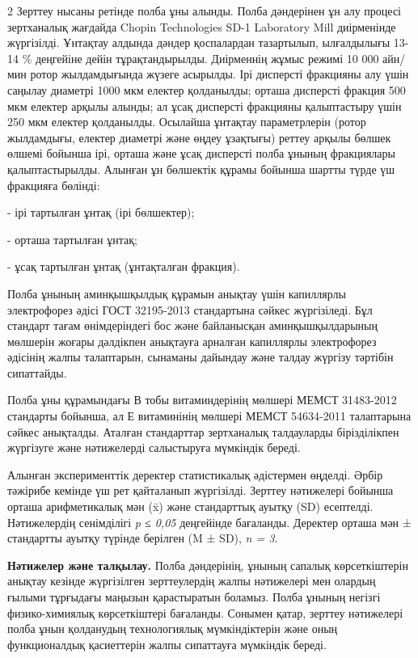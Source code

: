 \begin{multicols}{2}
Зерттеу нысаны ретінде полба ұны алынды. Полба дәндерінен ұн алу процесі
зертханалық жағдайда Chopin Technologies SD-1 Laboratory Mill
диірменінде жүргізілді. Ұнтақтау алдында дәндер қоспалардан тазартылып,
ылғалдылығы 13-14 \% деңгейіне дейін тұрақтандырылды. Диірменнің жұмыс
режимі 10 000 айн/мин ротор жылдамдығында жүзеге асырылды. Ірі дисперсті
фракцияны алу үшін саңылау диаметрі 1000 мкм електер қолданылды; орташа
дисперсті фракция 500 мкм електер арқылы алынды; ал ұсақ дисперсті
фракцияны қалыптастыру үшін 250 мкм електер қолданылды. Осылайша
ұнтақтау параметрлерін (ротор жылдамдығы, електер диаметрі және өңдеу
ұзақтығы) реттеу арқылы бөлшек өлшемі бойынша ірі, орташа және ұсақ
дисперсті полба ұнының фракциялары қалыптастырылды. Алынған ұн бөлшектік
құрамы бойынша шартты түрде үш фракцияға бөлінді:

- ірі тартылған ұнтақ (ірі бөлшектер);

- орташа тартылған ұнтақ;

- ұсақ тартылған ұнтақ (ұнтақталған фракция).

Полба ұнының аминқышқылдық құрамын анықтау үшін капиллярлы электрофорез
әдісі ГОСТ 32195-2013 стандартына сәйкес жүргізіледі. Бұл стандарт тағам
өнімдеріндегі бос және байланысқан аминқышқылдарының мөлшерін жоғары
дәлдікпен анықтауға арналған капиллярлы электрофорез әдісінің жалпы
талаптарын, сынаманы дайындау және талдау жүргізу тәртібін сипаттайды.

Полба ұны құрамындағы В тобы витаминдерінің мөлшері МЕМСТ 31483-2012
стандарты бойынша, ал Е витаминінің мөлшері МЕМСТ 54634-2011 талаптарына
сәйкес анықталды. Аталған стандарттар зертханалық талдауларды
бірізділікпен жүргізуге және нәтижелерді салыстыруға мүмкіндік береді.

Алынған эксперименттік деректер статистикалық әдістермен өңделді. Әрбір
тәжірибе кемінде үш рет қайталанып жүргізілді. Зерттеу нәтижелері
бойынша орташа арифметикалық мән (x̄) және стандарттық ауытқу (SD)
есептелді. Нәтижелердің сенімділігі \emph{p ≤ 0,05} деңгейінде
бағаланды. Деректер орташа мән ± стандартты ауытқу түрінде берілген (M ±
SD), \emph{n = 3}.

{\bfseries Нәтижелер және талқылау.} Полба дәндерінің, ұнының сапалық
көрсеткіштерін анықтау кезінде жүргізілген зерттеулердің жалпы
нәтижелері мен олардың ғылыми тұрғыдағы маңызын қарастыратын боламыз.
Полба ұнының негізгі физико-химиялық көрсеткіштері бағаланды. Сонымен
қатар, зерттеу нәтижелері полба ұнын қолданудың технологиялық
мүмкіндіктерін және оның функционалдық қасиеттерін жалпы сипаттауға
мүмкіндік береді.


\end{multicols}
